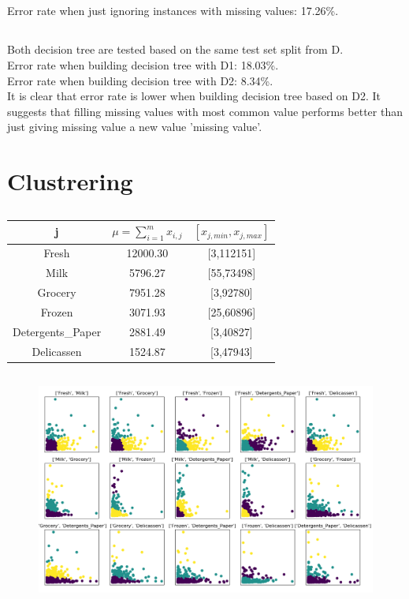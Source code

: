 \documentclass[12pt,a4paper]{report}
\begin{document}
	\subsection{}
  	Error rate when just ignoring instances with missing values: 17.26\%.
	\subsection{}
	Both decision tree are tested based on the same test set split from D.\\
  	Error rate when building decision tree with D1: 18.03\%.\\
  	Error rate when building decision tree with D2: 8.34\%.\\
  	It is clear that error rate is lower when building decision tree based on D2. It suggests that filling missing values with most common value performs better than just giving missing value a new value 'missing value'.
	\section{Clustrering}
	\subsection{}
	\begin{tabular}{|c|c|c|}
	\hline
	j&$\mu=\sum_{i=1}^{m}x_{i,j}$&$\left[x_{j,min},x_{j,max}\right]$\\
	\hline
	Fresh&12000.30&[3,112151]\\
	Milk&5796.27&[55,73498]\\
	Grocery&7951.28&[3,92780]\\
	Frozen&3071.93&[25,60896]\\
	Detergents\_Paper&2881.49&[3,40827]\\
	Delicassen&1524.87&[3,47943]\\
	\hline
	\end{tabular}

	\subsection{}
	\begin{figure}[htbp]
	\centering 
	\includegraphics[width=\textwidth]{kmeans_15.png} 
	\end{figure}
	
\end{document}
